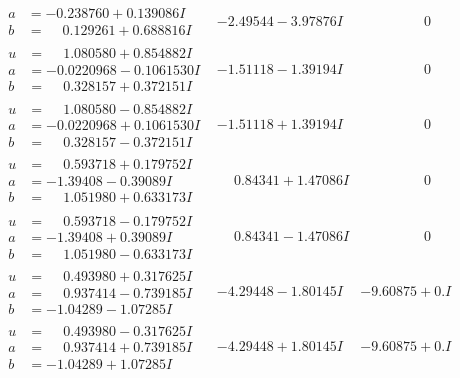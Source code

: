 \documentclass[1p]{elsarticle_modified}
\theoremstyle{definition}
\begin{document}
$$\begin{array}{c|c|c}
\begin{aligned}
a &= -0.238760 + 0.139086 I \\
b &= \phantom{-}0.129261 + 0.688816 I\end{aligned}
 & -2.49544 - 3.97876 I & \phantom{-0.000000 } 0 \\ \hline\begin{aligned}
u &= \phantom{-}1.080580 + 0.854882 I \\
a &= -0.0220968 - 0.1061530 I \\
b &= \phantom{-}0.328157 + 0.372151 I\end{aligned}
 & -1.51118 - 1.39194 I & \phantom{-0.000000 } 0 \\ \hline\begin{aligned}
u &= \phantom{-}1.080580 - 0.854882 I \\
a &= -0.0220968 + 0.1061530 I \\
b &= \phantom{-}0.328157 - 0.372151 I\end{aligned}
 & -1.51118 + 1.39194 I & \phantom{-0.000000 } 0 \\ \hline\begin{aligned}
u &= \phantom{-}0.593718 + 0.179752 I \\
a &= -1.39408 - 0.39089 I \\
b &= \phantom{-}1.051980 + 0.633173 I\end{aligned}
 & \phantom{-}0.84341 + 1.47086 I & \phantom{-0.000000 } 0 \\ \hline\begin{aligned}
u &= \phantom{-}0.593718 - 0.179752 I \\
a &= -1.39408 + 0.39089 I \\
b &= \phantom{-}1.051980 - 0.633173 I\end{aligned}
 & \phantom{-}0.84341 - 1.47086 I & \phantom{-0.000000 } 0 \\ \hline\begin{aligned}
u &= \phantom{-}0.493980 + 0.317625 I \\
a &= \phantom{-}0.937414 - 0.739185 I \\
b &= -1.04289 - 1.07285 I\end{aligned}
 & -4.29448 - 1.80145 I & -9.60875 + 0. I\phantom{ +0.000000I} \\ \hline\begin{aligned}
u &= \phantom{-}0.493980 - 0.317625 I \\
a &= \phantom{-}0.937414 + 0.739185 I \\
b &= -1.04289 + 1.07285 I\end{aligned}
 & -4.29448 + 1.80145 I & -9.60875 + 0. I\phantom{ +0.000000I} \\ \hline\begin{aligned}

\end{aligned}
\end{array}$$
\end{document}
